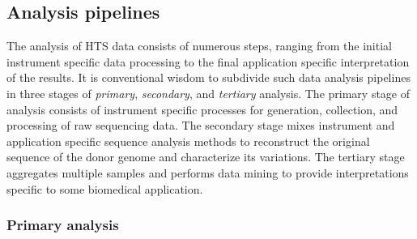 
\subsection{Analysis pipelines}

The analysis of HTS data consists of numerous steps, ranging from the initial instrument specific data processing to the final application specific interpretation of the results.
It is conventional wisdom to subdivide such data analysis pipelines in three stages of \emph{primary}, \emph{secondary}, and \emph{tertiary} analysis.
The primary stage of analysis consists of instrument specific processes for generation, collection, and processing of raw sequencing data.
The secondary stage mixes instrument and application specific sequence analysis methods to reconstruct the original sequence of the donor genome and characterize its variations.
The tertiary stage aggregates multiple samples and performs data mining to provide interpretations specific to some biomedical application.


\subsubsection{Primary analysis}

